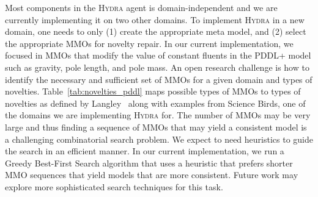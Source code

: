 \documentclass[sigconf]{aamas}
\newcommand{\sbirds}{Science Birds\xspace} %
\newcommand{\hydra}{\textsc{Hydra}\xspace} %
\begin{document}
Most components in the \hydra agent is domain-independent and we are currently implementing it on two other domains. 
To implement \hydra in a new domain, one needs to only (1) create the appropriate meta model, and (2) select the appropriate MMOs for novelty repair.
In our current implementation, we focused in MMOs that modify the value of constant fluents in the PDDL+ model such as gravity, pole length, and pole mass. 
An open research challenge is how to identify the necessary and sufficient set of MMOs for a given domain and types of novelties. 
Table~\ref{tab:novelties_pddl} maps possible types of MMOs to types of novelties as defined by Langley~\cite{langley2020open} along with examples from \sbirds, one of the domains we are implementing \hydra for.
The number of MMOs may be very large and thus finding a sequence of MMOs that may yield a consistent model is a challenging combinatorial search problem.  We expect to need heuristics to guide the search in an efficient manner. 
In our current implementation, we run a Greedy Best-First Search algorithm that uses a heuristic that prefers shorter MMO sequences that yield models that are more consistent. Future work may explore more sophisticated search techniques for this task. %








\end{document}

